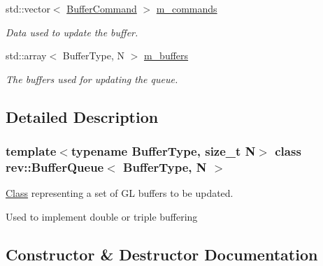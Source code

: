 \begin{Indent}
\begin{DoxyCompactItemize}
\mbox{\label{classrev_1_1_buffer_queue_ab402d5b59aae904f3bb4d61e47d37799}} 
std\+::vector$<$ \mbox{\hyperlink{structrev_1_1_buffer_command}{Buffer\+Command}} $>$ \mbox{\hyperlink{classrev_1_1_buffer_queue_ab402d5b59aae904f3bb4d61e47d37799}{m\+\_\+commands}}
\begin{DoxyCompactList}\small\item\em Data used to update the buffer. \end{DoxyCompactList}\item 
\mbox{\label{classrev_1_1_buffer_queue_a41e12d622a76521edecaf6103dee00b5}} 
std\+::array$<$ Buffer\+Type, N $>$ \mbox{\hyperlink{classrev_1_1_buffer_queue_a41e12d622a76521edecaf6103dee00b5}{m\+\_\+buffers}}
\begin{DoxyCompactList}\small\item\em The buffers used for updating the queue. \end{DoxyCompactList}\end{DoxyCompactItemize}
\end{Indent}


\subsection{Detailed Description}
\subsubsection*{template$<$typename Buffer\+Type, size\+\_\+t N$>$\newline
class rev\+::\+Buffer\+Queue$<$ Buffer\+Type, N $>$}

\mbox{\hyperlink{struct_class}{Class}} representing a set of GL buffers to be updated. 

Used to implement double or triple buffering 

\subsection{Constructor \& Destructor Documentation}
\mbox{\label{classrev_1_1_buffer_queue_a593525b33b1dae5e5f3b6dcb40489b0d}} 

